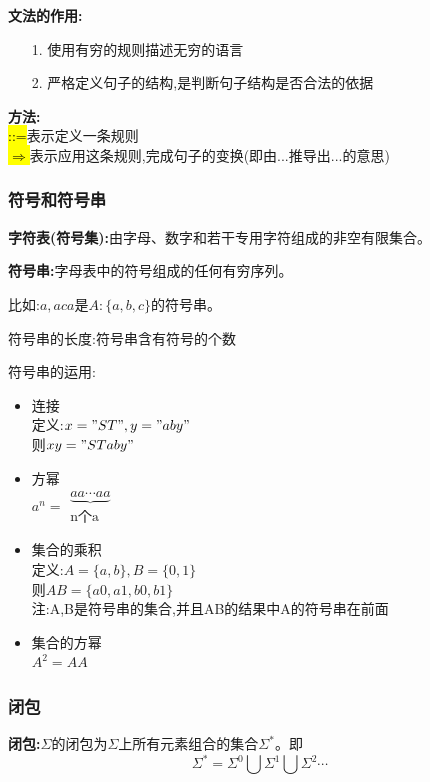     \textbf{文法的作用:}
    \begin{itemize}
      \item [1.] 使用有穷的规则描述无穷的语言
      \item [2.] 严格定义句子的结构,是判断句子结构是否合法的依据
    \end{itemize}

    \textbf{方法:}\\
    \hl{::=}表示定义一条规则\\
    \hl{$\Rightarrow$}表示应用这条规则,完成句子的变换(即由...推导出...的意思)

      \subsubsection{符号和符号串}
      \textbf{字符表(符号集):}由字母、数字和若干专用字符组成的非空有限集合。

      \textbf{符号串:}字母表中的符号组成的任何有穷序列。

      比如:$a,aca$是$A:\{a,b,c\}$的符号串。

      符号串的长度:符号串含有符号的个数

      符号串的运用:
      \begin{itemize}
        \item 连接\\
        定义:$x = "ST", y = "aby"$\\
        则$xy = "STaby"$

        \item 方幂\\
        $a^n = \begin{array}{c}\underbrace{aa\cdots aa}\\ \text{n个a} \end{array}$

        \item 集合的乘积\\
        定义:$A = \{a,b\} , B = \{0 ,1\}$\\
        则$AB = \{a0 , a1 , b0 , b1\}$\\
        注:A,B是符号串的集合,并且AB的结果中A的符号串在前面\\

        \item 集合的方幂\\
        $A^2 = AA$
      \end{itemize}

      \subsubsection{闭包}
      \textbf{闭包:}$\Sigma$的闭包为$\Sigma$上所有元素组合的集合$\Sigma^*$。即
      \begin{equation}
        \Sigma^* = \Sigma^0 \bigcup \Sigma^1 \bigcup \Sigma^2 \cdots
      \end{equation}

